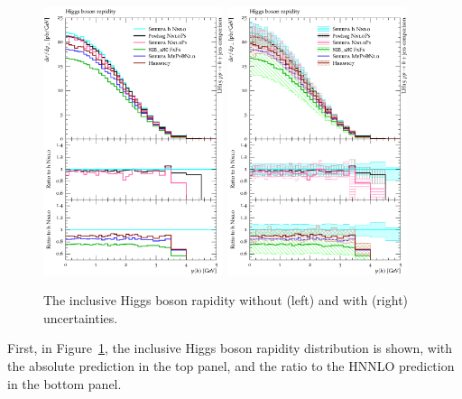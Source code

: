 \begin{figure}[t!]
  \centering
  \includegraphics[width=0.47\textwidth]{figures/hjetscomp_u_H_y.pdf}
  \hfill
  \includegraphics[width=0.47\textwidth]{figures/hjetscomp_H_y.pdf}
  \caption{
    The inclusive Higgs boson rapidity without (left) and with (right)
    uncertainties.
    \label{fig:higgscomp:results:inclobs:hy}
  }
\end{figure}

First, in Figure~\ref{fig:higgscomp:results:inclobs:hy}, the inclusive
Higgs boson rapidity distribution is shown, with the absolute
prediction in the top panel, and the ratio to the HNNLO prediction in
the bottom panel.


